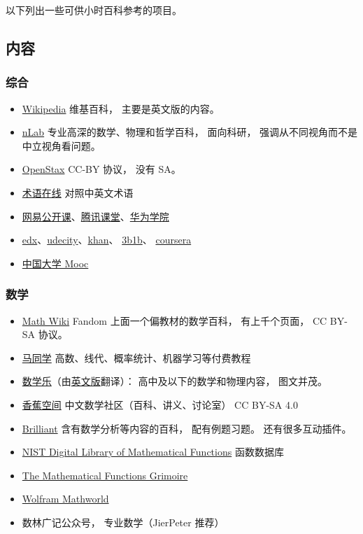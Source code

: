 
以下列出一些可供小时百科参考的项目。

\subsection{内容}
\subsubsection{综合}
\begin{itemize}
\item \href{https://en.wikipedia.org/wiki/Main_Page}{Wikipedia} 维基百科， 主要是英文版的内容。
\item \href{https://ncatlab.org/nlab/show/HomePage}{nLab} 专业高深的数学、物理和哲学百科， 面向科研， 强调从不同视角而不是中立视角看问题。
\item \href{https://openstax.org}{OpenStax} CC-BY 协议， 没有 SA。
\item \href{https://www.termonline.cn/index}{术语在线} 对照中英文术语
\item \href{https://open.163.com}{网易公开课}、\href{https://ke.qq.com}{腾讯课堂}、\href{https://edu.huaweicloud.com}{华为学院}
\item \href{https://www.edx.org}{edx}、\href{https://www.udacity.com}{udecity}、\href{https://www.khanacademy.org}{khan}、 \href{https://www.youtube.com/@3blue1brown}{3b1b}、 \href{https://www.coursera.org}{coursera}
\item \href{https://www.icourse163.org}{中国大学 Mooc}
\end{itemize}

\subsubsection{数学}
\begin{itemize}
\item \href{https://math.fandom.com/}{Math Wiki} Fandom 上面一个偏教材的数学百科， 有上千个页面， CC BY-SA 协议。
\item \href{https://www.matongxue.com}{马同学} 高数、线代、概率统计、机器学习等付费教程 %
\item \href{https://www.shuxuele.com}{数学乐}（由\href{https://www.mathsisfun.com}{英文版}翻译）： 高中及以下的数学和物理内容， 图文并茂。
\item \href{https://www.bananaspace.org/wiki}{香蕉空间} 中文数学社区（百科、讲义、讨论室） CC BY-SA 4.0
\item \href{https://brilliant.org}{Brilliant} 含有数学分析等内容的百科， 配有例题习题。 还有很多互动插件。
\item \href{https://dlmf.nist.gov}{NIST Digital Library of Mathematical Functions} 函数数据库
\item \href{https://fungrim.org}{The Mathematical Functions Grimoire}
\item \href{https://mathworld.wolfram.com}{Wolfram Mathworld}
\item 数林广记公众号， 专业数学（JierPeter 推荐）
\end{itemize}

